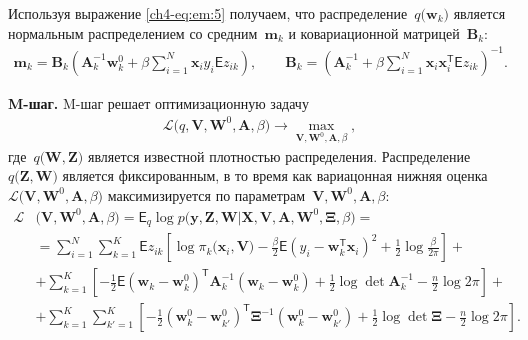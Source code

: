 \documentclass{dissert}
\newcommand{\paragraph}[1]{\noindent\textbf{#1}\quad}
\begin{document}
Используя выражение \eqref{ch4-eq:em:5} получаем, что  распределение~$q\bigr(\mathbf{w}_{k}\bigr)$ является нормальным распределением со средним~$\mathbf{m}_{k}$ и ковариационной матрицей~$\mathbf{B}_k$:
\[
\label{ch4-eq:em:6}
\begin{aligned}
\mathbf{m}_{k} = \mathbf{B}_{k}\left(\mathbf{A}_{k}^{-1}\mathbf{w}_{k}^{0}+\beta\sum_{i=1}^{N}\mathbf{x}_{i}y_{i}\mathsf{E}z_{ik}\right), \qquad \mathbf{B}_{k} = \left(\mathbf{A}_{k}^{-1}+\beta\sum_{i=1}^{N}\mathbf{x}_{i}\mathbf{x}_{i}^{\mathsf{T}}\mathsf{E}z_{ik}\right)^{-1}.
\end{aligned}
\]

\paragraph{M-шаг.} M-шаг решает оптимизационную задачу
\[
\label{ch4-eq:em:new:3}
\begin{aligned}
\mathcal{L}\bigr(q, \textbf{V}, \textbf{W}^{0}, \textbf{A}, \beta\bigr) \to \max_{\textbf{V}, \textbf{W}^{0}, \textbf{A}, \beta},
\end{aligned}
\]
где~$q\bigr(\textbf{W}, \textbf{Z}\bigr)$ является известной плотностью распределения.
Распределение~$q\bigr(\mathbf{Z}, \mathbf{W}\bigr)$ является фиксированным, в то время как вариацонная нижняя оценка~$\mathcal{L}\bigr(\textbf{V}, \textbf{W}^{0}, \textbf{A}, \beta\bigr)$ максимизируется по параметрам~$\mathbf{V}, \mathbf{W}^0, \textbf{A},  \beta$:
\[
\label{ch4-eq:em:7}
\begin{aligned}
\mathcal{L}&\bigr(\textbf{V}, \textbf{W}^{0}, \textbf{A}, \beta\bigr) = \mathsf{E}_{q}\log p\bigr(\mathbf{y}, \mathbf{Z}, \mathbf{W}|\mathbf{X}, \mathbf{V}, \textbf{A}, \textbf{W}^{0}, \bm{\Xi}, \beta\bigr) =  \\
&= \sum_{i=1}^{N}\sum_{k=1}^{K}\mathsf{E}z_{ik}\left[\log\pi_k\bigr(\textbf{x}_i, \textbf{V}\bigr) - \frac{\beta}{2}\mathsf{E}\left(y_{i} - \textbf{w}_{k}^{\mathsf{T}}\textbf{x}_{i}\right)^{2} + \frac{1}{2}\log\frac{\beta}{2\pi}\right] +\\
&+ \sum_{k=1}^{K}\left[-\frac{1}{2}\mathsf{E}\left(\textbf{w}_{k} - \textbf{w}_{k}^{0}\right)^{\mathsf{T}}\textbf{A}_{k}^{-1}\left(\textbf{w}_{k} - \textbf{w}_{k}^{0}\right) + \frac{1}{2}\log\det\textbf{A}^{-1}_{k} - \frac{n}{2}\log2\pi\right] +\\
&+ \sum_{k=1}^{K}\sum_{k'=1}^{K}\left[-\frac{1}{2}\left(\textbf{w}_{k}^{0}-\textbf{w}_{k'}^{0}\right)^{\mathsf{T}}\bm{\Xi}^{-1}\left(\textbf{w}_{k}^{0}-\textbf{w}_{k'}^{0}\right) +\frac{1}{2}\log\det\bm{\Xi} -\frac{n}{2}\log{2\pi}\right].
\end{aligned}
\]
\end{document}
